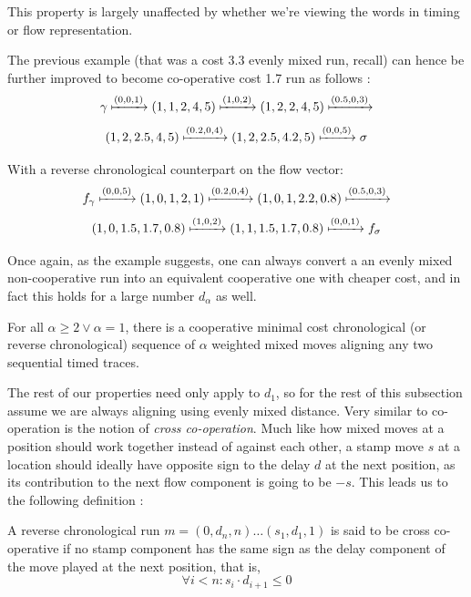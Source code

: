 \documentclass[runningheads]{llncs}
\begin{document}
	This property is largely unaffected by whether we're viewing the words in timing or flow representation. 
	
	\begin{example}The previous example (that was a cost 3.3 evenly mixed run, recall) can hence be further improved to become co-operative cost 1.7 run as follows : 
		$$\gamma \xmapsto{(0, 0, 1)} (1, 1, 2, 4, 5) \xmapsto{(1, 0, 2)} (1, 2, 2, 4, 5) \xmapsto{(0.5, 0, 3)} $$
		$$(1, 2, 2.5, 4, 5) \xmapsto{(0.2, 0, 4)} (1, 2, 2.5, 4.2, 5) \xmapsto{(0, 0, 5)} \sigma $$
		
		With a reverse chronological counterpart on the flow vector: 
		$$f_\gamma \xmapsto{(0, 0, 5)} (1, 0, 1, 2, 1) \xmapsto{(0.2, 0, 4)} (1, 0, 1, 2.2, 0.8) \xmapsto{(0.5, 0, 3)} $$$$(1, 0, 1.5, 1.7, 0.8) \xmapsto{(1, 0, 2)} (1, 1, 1.5, 1.7, 0.8) \xmapsto{(0, 0, 1)} f_\sigma $$
		
	\end{example}
	
	Once again, as the example suggests, one can always convert a an evenly mixed non-cooperative run into an equivalent cooperative one with cheaper cost, and in fact this holds for a large number $d_{\alpha}$ as well. 
	
	\begin{lemma}\label{linescoop} For all $\alpha \geq 2 \vee \alpha = 1$, there is a cooperative minimal cost chronological (or reverse chronological) sequence of $\alpha$ weighted mixed moves aligning any two sequential timed traces. 
	\end{lemma}
	
	The rest of our properties need only apply to $d_1$, so for the rest of this subsection assume we are always aligning using evenly mixed distance. Very similar to co-operation is the notion of \emph{cross co-operation}. Much like how mixed moves at a position should work together instead of against each other, a stamp move $s$ at a location should ideally have opposite sign to the delay $d$ at the next position, as its contribution to the next flow component is going to be $-s$. This leads us to the following definition : 
	
	\begin{definition}
		A reverse chronological run ${m = (0, d_n, n) \dots (s_1, d_1, 1)}$ is said to be cross co-operative if no stamp component has the same sign as the delay component of the move played at the next position, that is, $$\forall i < n : s_i \cdot d_{i+1} \leq 0$$
	\end{definition}
	
\end{document}
